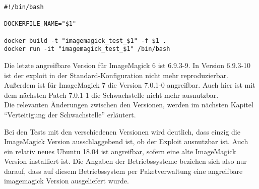 \begin{lstlisting}[language=Text, caption=Script debug.sh in Testsuite,label={lst:testsuitedebugcall}]
#!/bin/bash

DOCKERFILE_NAME="$1"

docker build -t "imagemagick_test_$1" -f $1 .
docker run -it "imagemagick_test_$1" /bin/bash
\end{lstlisting}


Die letzte angreifbare Version für ImageMagick 6 ist 6.9.3-9.
In Version 6.9.3-10 ist der exploit in der Standard-Konfiguration nicht mehr reproduzierbar.
Außerdem ist für ImageMagick 7 die Version 7.0.1-0 angreifbar.
Auch hier ist mit dem nächsten Patch 7.0.1-1 die Schwachstelle nicht mehr ausnutzbar.\\
Die relevanten Änderungen zwischen den Versionen, werden im nächsten Kapitel "`Verteitigung der Schwachstelle"' erläutert.

Bei den Tests mit den verschiedenen Versionen wird deutlich, dass einzig die ImageMagick Version ausschlaggebend ist,
ob der Exploit ausnutzbar ist.
Auch ein relativ neues Ubuntu 18.04 ist angreifbar, sofern eine alte ImageMagick Version installiert ist.
Die Angaben der Betriebssysteme beziehen sich also nur darauf,
dass auf diesem Betriebssystem per Paketverwaltung eine angreifbare imagemagick Version ausgeliefert wurde.\\